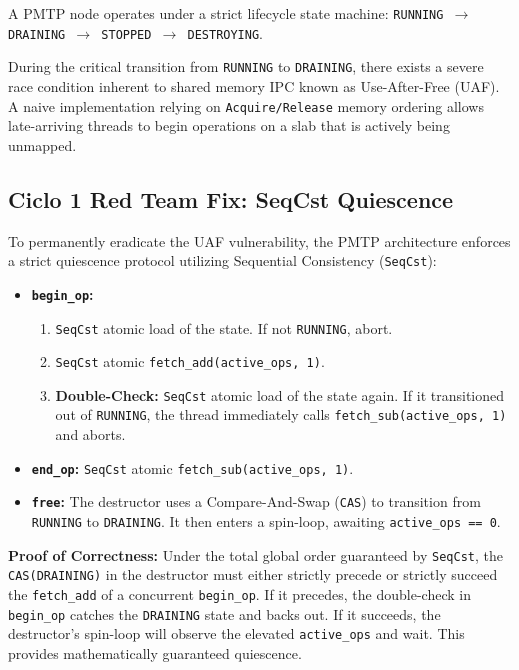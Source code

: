 A PMTP node operates under a strict lifecycle state machine: \texttt{RUNNING $\to$ DRAINING $\to$ STOPPED $\to$ DESTROYING}. 

During the critical transition from \texttt{RUNNING} to \texttt{DRAINING}, there exists a severe race condition inherent to shared memory IPC known as Use-After-Free (UAF). A naive implementation relying on \texttt{Acquire/Release} memory ordering allows late-arriving threads to begin operations on a slab that is actively being unmapped.

\subsection{Ciclo 1 Red Team Fix: SeqCst Quiescence}
To permanently eradicate the UAF vulnerability, the PMTP architecture enforces a strict quiescence protocol utilizing Sequential Consistency (\texttt{SeqCst}):

\begin{itemize}
    \item \textbf{\texttt{begin\_op}:}
    \begin{enumerate}
        \item \texttt{SeqCst} atomic load of the state. If not \texttt{RUNNING}, abort.
        \item \texttt{SeqCst} atomic \texttt{fetch\_add(active\_ops, 1)}.
        \item \textbf{Double-Check:} \texttt{SeqCst} atomic load of the state again. If it transitioned out of \texttt{RUNNING}, the thread immediately calls \texttt{fetch\_sub(active\_ops, 1)} and aborts.
    \end{enumerate}
    \item \textbf{\texttt{end\_op}:} \texttt{SeqCst} atomic \texttt{fetch\_sub(active\_ops, 1)}.
    \item \textbf{\texttt{free}:} The destructor uses a Compare-And-Swap (\texttt{CAS}) to transition from \texttt{RUNNING} to \texttt{DRAINING}. It then enters a spin-loop, awaiting \texttt{active\_ops == 0}.
\end{itemize}

\textbf{Proof of Correctness:} Under the total global order guaranteed by \texttt{SeqCst}, the \texttt{CAS(DRAINING)} in the destructor must either strictly precede or strictly succeed the \texttt{fetch\_add} of a concurrent \texttt{begin\_op}. If it precedes, the double-check in \texttt{begin\_op} catches the \texttt{DRAINING} state and backs out. If it succeeds, the destructor's spin-loop will observe the elevated \texttt{active\_ops} and wait. This provides mathematically guaranteed quiescence.

